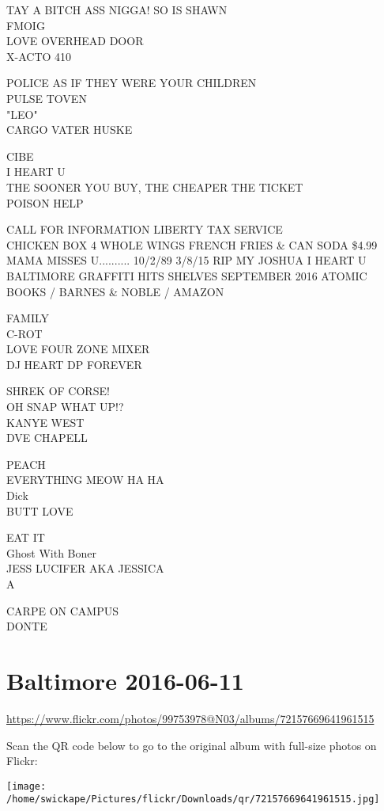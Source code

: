 \documentclass[10pt,letterpaper]{article}
\begin{document}
TAY A BITCH ASS NIGGA!  SO IS SHAWN\\
FMOIG\\
LOVE OVERHEAD DOOR\\
X{-}ACTO 410

POLICE AS IF THEY WERE YOUR CHILDREN\\
PULSE TOVEN\\
"LEO"\\
CARGO VATER HUSKE

CIBE\\
I HEART U\\
THE SOONER YOU BUY, THE CHEAPER THE TICKET\\
POISON HELP

CALL FOR INFORMATION LIBERTY TAX SERVICE\\
CHICKEN BOX 4 WHOLE WINGS FRENCH FRIES \& CAN SODA \$4.99\\
MAMA MISSES U.......... 10/2/89 3/8/15 RIP MY JOSHUA I HEART U\\
BALTIMORE GRAFFITI HITS SHELVES SEPTEMBER 2016 ATOMIC BOOKS / BARNES \& NOBLE / AMAZON

FAMILY\\
C{-}ROT\\
LOVE FOUR ZONE MIXER\\
DJ HEART DP FOREVER

SHREK OF CORSE!\\
OH SNAP WHAT UP!?\\
KANYE WEST\\
DVE CHAPELL

PEACH\\
EVERYTHING MEOW HA HA\\
Dick\\
BUTT LOVE

EAT IT\\
Ghost With Boner\\
JESS LUCIFER AKA JESSICA\\
A

CARPE ON CAMPUS\\
DONTE


\section*{Baltimore 2016-06-11}

\url{https://www.flickr.com/photos/99753978@N03/albums/72157669641961515}

Scan the QR code below to go to the original album with full-size photos on Flickr:

\texttt{[image: /home/swickape/Pictures/flickr/Downloads/qr/72157669641961515.jpg]}
\end{document}
